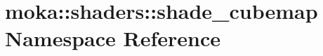 \hypertarget{namespacemoka_1_1shaders_1_1shade__cubemap}{}\section{moka\+::shaders\+::shade\+\_\+cubemap Namespace Reference}
\label{namespacemoka_1_1shaders_1_1shade__cubemap}
